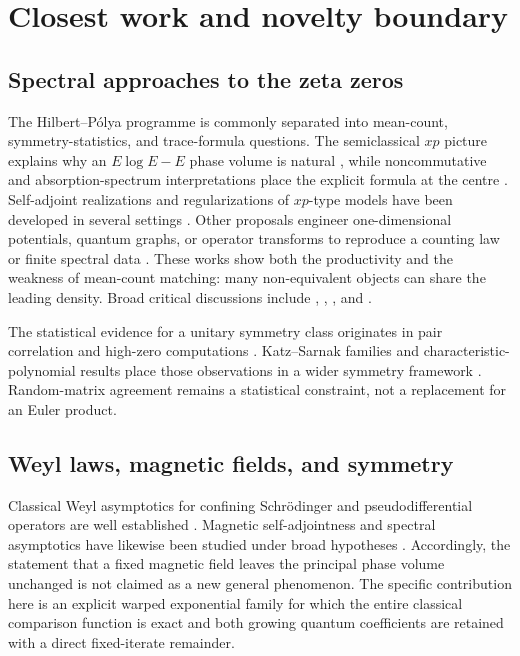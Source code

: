 \section{Closest work and novelty boundary}
\label{sec:related}

\subsection{Spectral approaches to the zeta zeros}

The Hilbert--P\'olya programme is commonly separated into mean-count,
symmetry-statistics, and trace-formula questions.  The semiclassical
\(xp\) picture explains why an \(E\log E-E\) phase volume is natural
\citep{BerryKeating1999}, while noncommutative and absorption-spectrum
interpretations place the explicit formula at the centre
\citep{Connes1999}.  Self-adjoint realizations and regularizations of
\(xp\)-type models have been developed in several settings
\citep{Sierra2008,SierraTownsend2008,SierraRodriguezLaguna2011,EndresSteiner2010,GiordanoNegroTateo2023}.
Other proposals engineer one-dimensional potentials, quantum graphs, or
operator transforms to reproduce a counting law or finite spectral data
\citep{WuSprung1993,SchumayerVanZylHutchinson2008,KuipersHummelRichter2014,Yakaboylu2024}.
These works show both the productivity and the weakness of mean-count
matching: many non-equivalent objects can share the leading density.  Broad
critical discussions include \citet{SchumayerHutchinson2011},
\citet{Lagarias2009}, \citet{Rahm2022}, and \citet{Crehan1995}.

The statistical evidence for a unitary symmetry class originates in pair
correlation and high-zero computations
\citep{Montgomery1973,Odlyzko1987,RudnickSarnak1996}.  Katz--Sarnak families
and characteristic-polynomial results place those observations in a wider
symmetry framework
\citep{KatzSarnak1999Zeros,KatzSarnak1999,KeatingSnaith2000}.
Random-matrix agreement remains a statistical constraint, not a replacement
for an Euler product.

\subsection{Weyl laws, magnetic fields, and symmetry}

Classical Weyl asymptotics for confining Schr\"odinger and
pseudodifferential operators are well established
\citep{Rozenblum1974,HelfferRobert1982,Tachizawa1992,Ivrii2016}.
Magnetic self-adjointness and spectral asymptotics have likewise been studied
under broad hypotheses
\citep{LeinfelderSimader1981,AvronHerbstSimon1978,Tamura1987,Matsumoto1991,DimassiDuong2014}.
Accordingly, the statement that a fixed magnetic field leaves the principal
phase volume unchanged is not claimed as a new general phenomenon.  The
specific contribution here is an explicit warped exponential family for
which the entire classical comparison function is exact and both growing
quantum coefficients are retained with a direct fixed-iterate remainder.

